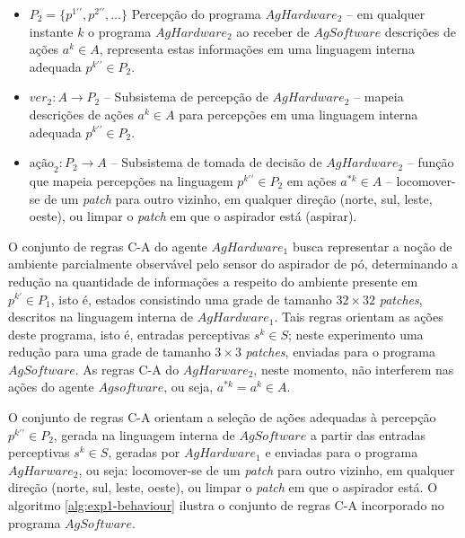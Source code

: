 \begin{itemize}
    \item $P_2 = \{p^{1\prime\prime}, p^{2\prime\prime}, \ldots\}$	Percepção do programa $AgHardware_2$ – em qualquer instante $k$ o programa $AgHardware_2$ ao receber de $AgSoftware$ descrições de ações $a^k \in A$, representa estas informações em uma linguagem interna adequada $p^{k\prime\prime} \in P_2$.
    
    \item $ver_2: A  \rightarrow P_2$ -- Subsistema de percepção de $AgHardware_2$ – mapeia descrições de ações $a^k \in A$ para percepções em uma linguagem interna adequada $p^{k\prime\prime} \in P_2$.
    
    \item $\textrm{ação}_2: P_2 \rightarrow A$ -- Subsistema de tomada de decisão de $AgHardware_2$ – função que mapeia percepções na linguagem $p^{k\prime\prime} \in P_2$ em ações $a^{*k} \in A$ – locomover-se de um \textit{patch} para outro vizinho, em qualquer direção (norte, sul, leste, oeste), ou limpar o \textit{patch} em que o aspirador está (aspirar).
    
\end{itemize}

O conjunto de regras C-A do agente $AgHardware_1$ busca representar a noção de ambiente parcialmente observável pelo sensor do aspirador de pó, determinando a redução na quantidade de informações a respeito do ambiente presente em $p^{k\prime} \in P_1$, isto é, estados consistindo uma grade de tamanho $32 \times 32$ \textit{patches}, descritos na linguagem interna de $AgHardware_1$. Tais regras orientam as ações deste programa, isto é, entradas perceptivas $s^k \in S$; neste experimento uma redução para uma grade de tamanho $3 \times 3$ \textit{patches}, enviadas para o programa $AgSoftware$. As regras C-A do $AgHarware_2$, neste momento, não interferem nas ações do agente  $Agsoftware$, ou seja, $a^{*k} = a^k \in A$.

O conjunto de regras C-A orientam a seleção de ações adequadas à percepção $p^{k\prime\prime} \in P_2$, gerada na linguagem interna de $AgSoftware$ a partir das entradas perceptivas $s^k \in S$, geradas por $AgHardware_1$ e enviadas para o programa $AgHarware_2$, ou seja: locomover-se de um \textit{patch} para outro vizinho, em qualquer direção (norte, sul, leste, oeste), ou limpar o \textit{patch} em que o aspirador está. O algoritmo \ref{alg:exp1-behaviour} ilustra o conjunto de regras C-A incorporado no programa $AgSoftware$.

